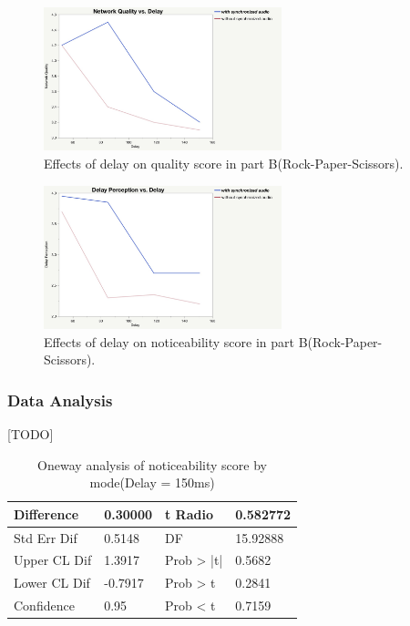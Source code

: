\begin{figure}[H]
\centering
\includegraphics[width=6.9cm]{figures/figure_experiment2_NQ.jpg}
\setlength{\abovecaptionskip}{0.5cm}
\caption{Effects of delay on quality score in part B(Rock-Paper-Scissors).}
\label{4}
\end{figure}

\begin{figure}[H]
\centering
\includegraphics[width=6.9cm]{figures/figure_experiment2_DP.jpg}
\setlength{\abovecaptionskip}{0.5cm}
\caption{Effects of delay on noticeability score in part B(Rock-Paper-Scissors).}
\label{4}
\end{figure}


\subsubsection{Data Analysis}[TODO]

\begin{table} [!htbp]
\begin{tabular}{|p{}|p{}|p{}|p{}|}
\hline 
Difference & 0.30000 & t Radio & 0.582772 \\
\hline
Std Err Dif & 0.5148 & DF & 15.92888 \\
\hline
Upper CL Dif & 1.3917 & Prob > |t| & 0.5682 \\
\hline
Lower CL Dif & -0.7917 & Prob > t & 0.2841 \\
\hline
Confidence & 0.95 & Prob < t & 0.7159 \\
\hline
\end{tabular}
\caption{Oneway analysis of noticeability score by mode(Delay = 150ms)}
\label{tab:table_questionnaire}
\end{table}


